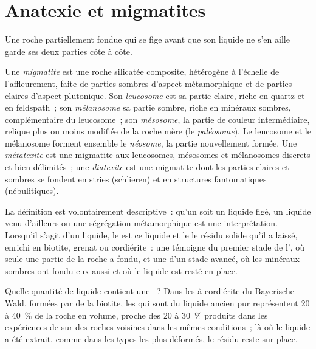 \section{Anatexie et migmatites}\label{sec:b2:crustal-melting:migmatites}

Une roche partiellement fondue qui se fige avant que son liquide ne s'en aille garde ses deux parties côte à côte.

\begin{definition}\label{def:b2:crustal-melting:migmatite}
Une \emph{migmatite} est une roche silicatée composite,
hétérogène à l'échelle de l'affleurement, faite de parties sombres d'aspect métamorphique
et de parties claires d'aspect plutonique. Son \emph{leucosome} est sa partie claire,
riche en quartz et en feldspath~; son \emph{mélanosome} sa partie sombre, riche en
minéraux sombres, complémentaire du leucosome~; son \emph{mésosome}, la partie de couleur intermédiaire,
relique plus ou moins modifiée de la roche mère (le \emph{paléosome}). Le leucosome et le mélanosome
forment ensemble le \emph{néosome}, la partie nouvellement formée. Une \emph{métatexite}
est une migmatite aux leucosomes, mésosomes et mélanosomes discrets et bien délimités~; une
\emph{diatexite} est une migmatite dont les parties claires et sombres se fondent en
stries (schlieren) et en structures fantomatiques (nébulitiques).
\end{definition}

La définition est volontairement descriptive~: qu'un  soit un liquide figé, un liquide venu
d'ailleurs ou une ségrégation métamorphique est une interprétation. Lorsqu'il s'agit d'un liquide,
le  est ce liquide et le  le résidu solide qu'il a laissé, enrichi en biotite,
grenat ou cordiérite~: une  témoigne du premier stade de l', où seule une partie
de la roche a fondu, et une  d'un stade avancé, où les minéraux sombres ont fondu eux aussi
et où le liquide est resté en place.

Quelle quantité de liquide contient une ~? Dans les  à cordiérite du Bayerische Wald,
formées par  de la biotite, les  qui sont du liquide ancien pur représentent 20 à
\qty{40}{\percent} de la roche en volume, proche des 20 à \qty{30}{\percent} produits dans les expériences de
 sur des roches voisines dans les mêmes conditions~; là où le liquide a été extrait, comme dans
les types les plus déformés, le résidu reste sur place.

